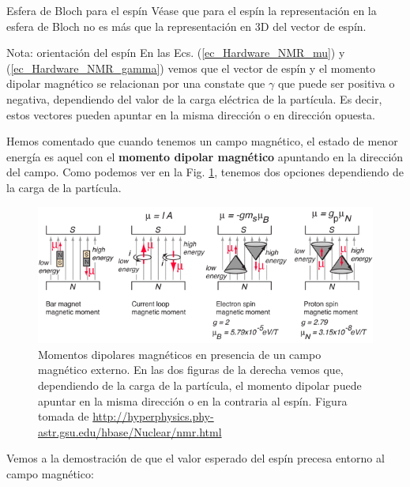 \documentclass[a4paper,11pt]{book} %
\numberwithin{equation}{chapter}
\begin{document}
	\begin{mybox_blue}{Esfera de Bloch para el espín}
	Véase que para el espín la representación en la esfera de Bloch no es más que la representación 
	en 3D del vector de espín. 	
	\end{mybox_blue}

	\begin{mybox_blue}{Nota: orientación del espín}
	En las Ecs. (\ref{ec_Hardware_NMR_mu}) y (\ref{ec_Hardware_NMR_gamma}) vemos que el vector de espín
	y el momento dipolar magnético se relacionan por una constate que $\gamma$ que puede ser positiva o 
	negativa, dependiendo del valor de la carga eléctrica de la partícula. Es decir, estos vectores pueden 
	apuntar en la misma dirección o en dirección opuesta. 

	\vspace{0.3cm}	
	Hemos comentado que cuando tenemos un campo magnético, el
	estado de menor energía es aquel con el \textbf{momento dipolar magnético} apuntando en la dirección 
	del campo. Como podemos ver en la Fig. \ref{Fig_Hardware_NMR_espines_en_B}, tenemos dos opciones 
	dependiendo de la carga de la partícula.
		\begin{figure}[H]
		\centering 
		\includegraphics[width=1\linewidth]{Figuras/Fig_Hardware_NMR_espines_en_B.png}
		\caption{Momentos dipolares magnéticos en presencia de un campo magnético externo. En las dos figuras
		de la derecha vemos que, dependiendo de la carga de la partícula, el momento dipolar puede apuntar 
		en la misma dirección o en la contraria al espín. Figura tomada de 
		\url{http://hyperphysics.phy-astr.gsu.edu/hbase/Nuclear/nmr.html}}
		\label{Fig_Hardware_NMR_espines_en_B}
		\end{figure}
	\end{mybox_blue}


Vemos a la demostración de que el valor esperado del espín precesa entorno al campo magnético:
\end{document}
